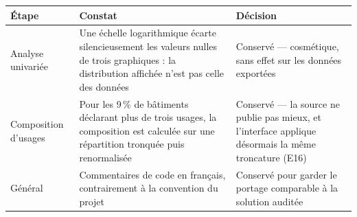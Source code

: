 \begin{table}[H]
\centering
\small
\begin{tabularx}{\linewidth}{@{}L{2.6cm}XL{3.4cm}@{}}
\toprule
\textbf{Étape} & \textbf{Constat} & \textbf{Décision} \\
\midrule
Analyse univariée & Une échelle logarithmique écarte silencieusement les valeurs nulles de trois graphiques : la distribution affichée n'est pas celle des données & Conservé — cosmétique, sans effet sur les données exportées \\
Composition d'usages & Pour les 9\,\% de bâtiments déclarant plus de trois usages, la composition est calculée sur une répartition tronquée puis renormalisée & Conservé — la source ne publie pas mieux, et l'interface applique désormais la même troncature (E16) \\
Général & Commentaires de code en français, contrairement à la convention du projet & Conservé pour garder le portage comparable à la solution auditée \\
\bottomrule
\end{tabularx}
\end{table}

